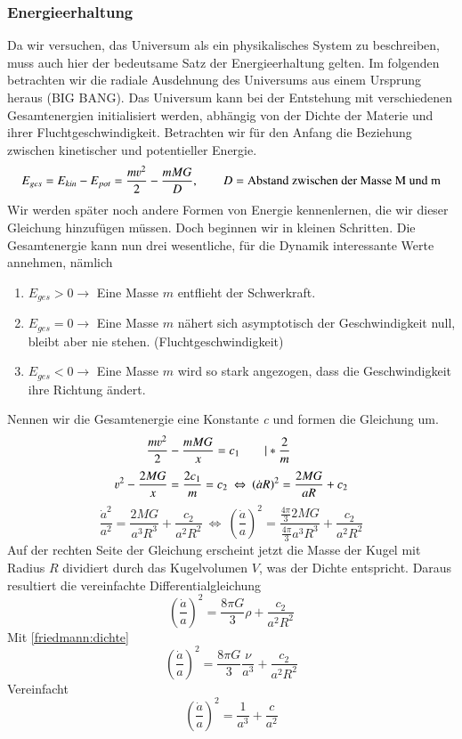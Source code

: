 \begin{refsection}
\subsubsection{Energieerhaltung}
Da wir versuchen, das Universum als ein physikalisches System zu beschreiben, muss auch hier der bedeutsame Satz der Energieerhaltung gelten. Im folgenden betrachten wir die radiale Ausdehnung des Universums aus einem Ursprung heraus (BIG BANG). Das Universum kann bei der Entstehung mit verschiedenen Gesamtenergien initialisiert werden, abhängig von der Dichte der Materie und ihrer Fluchtgeschwindigkeit. Betrachten wir für den Anfang die Beziehung zwischen kinetischer und potentieller Energie.
\begin{equation}
E_{ges} = E_{kin} - E_{pot} =  \frac{m \varv^2}{2} - \frac{m M G }{D}, \qquad D = \text{Abstand zwischen der Masse M und m}
\end{equation}
Wir werden später noch andere Formen von Energie kennenlernen, die wir dieser Gleichung hinzufügen müssen. Doch beginnen wir in kleinen Schritten. Die Gesamtenergie kann nun drei wesentliche, für die Dynamik interessante Werte annehmen, nämlich
\begin{enumerate}
	\item $E_{ges} > 0 \rightarrow$ Eine Masse $m$ entflieht der Schwerkraft.
	\item $E_{ges} = 0 \rightarrow$ Eine Masse $m$ nähert sich asymptotisch  der Geschwindigkeit null, bleibt aber nie stehen. (Fluchtgeschwindigkeit)
	\item $E_{ges} < 0 \rightarrow$ Eine Masse $m$ wird so stark angezogen, dass die Geschwindigkeit ihre Richtung ändert.
\end{enumerate}
Nennen wir die Gesamtenergie eine Konstante \textit{c} und formen die Gleichung um.
\[\frac{m \varv^2}{2} - \frac{m M G}{x} = c_1 \qquad| *\frac{2}{m} \qquad \]
\[{\varv^2} - \frac{2 M G}{x} = \frac{2c_1}{m} = c_2
\:  \Leftrightarrow \: \left( \dot{a} R\right)^2 = \frac{2 M G}{a R} + c_2\] 
\[\frac{\dot{a}^2}{a^2} = \frac{2 M G}{a^3 R^3} + \frac{c_2}{a^2 R^2} \: \Leftrightarrow \: \left(\frac{\dot{a}}{a} \right)^2 = \frac{\frac{4 \pi}{3}2 M G}{\frac{4 \pi}{3} a^3 R^3} + \frac{c_2}{a^2 R^2} \] %
Auf der rechten Seite der Gleichung erscheint jetzt die Masse der Kugel mit Radius $R$ dividiert durch das Kugelvolumen $V$, was der Dichte entspricht. Daraus resultiert die vereinfachte Differentialgleichung 
\begin{equation}
\left(\frac{\dot{a}}{a} \right)^2 = \frac{8 \pi G}{3} \rho + \frac{c_2}{a^2 R^2}
\label{friedmann:EnergieerhaltungUniversum}
\end{equation}
Mit \ref{friedmann:dichte}
\[
\left(\frac{\dot{a}}{a} \right)^2 = \frac{8 \pi G}{3} \frac{\nu}{a^3} + \frac{c_2}{a^2 R^2}
\]
Vereinfacht
\begin{equation}
\left(\frac{\dot{a}}{a} \right)^2 = \frac{1}{a^3} + \frac{c}{a^2}
\end{equation}


\end{refsection}
